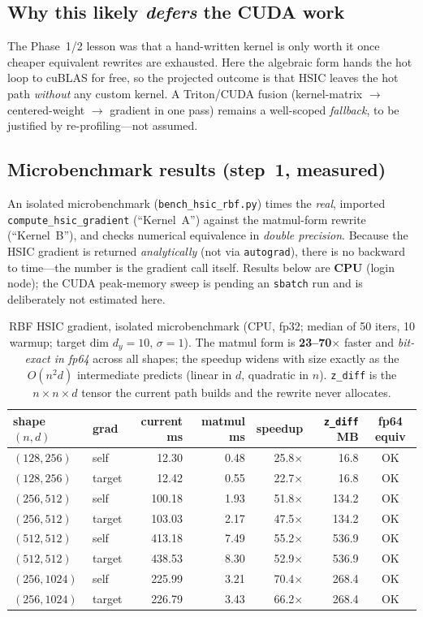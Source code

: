 \documentclass[11pt]{article}
\begin{document}
\subsection*{Why this likely \emph{defers} the CUDA work}
The Phase~1/2 lesson was that a hand-written kernel is only worth it once cheaper equivalent
rewrites are exhausted. Here the algebraic form hands the hot loop to cuBLAS for free, so the
projected outcome is that HSIC leaves the hot path \emph{without} any custom kernel. A Triton/CUDA
fusion (kernel-matrix $\to$ centered-weight $\to$ gradient in one pass) remains a well-scoped
\emph{fallback}, to be justified by re-profiling---not assumed.

\subsection*{Microbenchmark results (step~1, measured)}
An isolated microbenchmark (\texttt{bench\_hsic\_rbf.py}) times the \emph{real}, imported
\texttt{compute\_hsic\_gradient} (``Kernel~A'') against the matmul-form rewrite (``Kernel~B''),
and checks numerical equivalence in \emph{double precision}. Because the HSIC gradient is returned
\emph{analytically} (not via \texttt{autograd}), there is no backward to time---the number is the
gradient call itself. Results below are \textbf{CPU} (login node); the CUDA peak-memory sweep is
pending an \texttt{sbatch} run and is deliberately not estimated here.

\begin{table}[h]
\centering
\small
\begin{tabular}{@{}llrrrrc@{}}
\toprule
\textbf{shape $(n,d)$} & \textbf{grad} & \textbf{current ms} & \textbf{matmul ms} &
\textbf{speedup} & \textbf{\texttt{z\_diff} MB} & \textbf{fp64 equiv} \\
\midrule
$(128,256)$  & self   & 12.30  & 0.48 & 25.8$\times$ & 16.8  & OK \\
$(128,256)$  & target & 12.42  & 0.55 & 22.7$\times$ & 16.8  & OK \\
$(256,512)$  & self   & 100.18 & 1.93 & 51.8$\times$ & 134.2 & OK \\
$(256,512)$  & target & 103.03 & 2.17 & 47.5$\times$ & 134.2 & OK \\
$(512,512)$  & self   & 413.18 & 7.49 & 55.2$\times$ & 536.9 & OK \\
$(512,512)$  & target & 438.53 & 8.30 & 52.9$\times$ & 536.9 & OK \\
$(256,1024)$ & self   & 225.99 & 3.21 & 70.4$\times$ & 268.4 & OK \\
$(256,1024)$ & target & 226.79 & 3.43 & 66.2$\times$ & 268.4 & OK \\
\bottomrule
\end{tabular}
\caption{RBF HSIC gradient, isolated microbenchmark (CPU, fp32; median of 50 iters, 10 warmup;
target dim $d_y{=}10$, $\sigma{=}1$). The matmul form is \textbf{23--70$\times$} faster and
\emph{bit-exact in fp64} across all shapes; the speedup widens with size exactly as the
$O(n^2 d)$ intermediate predicts (linear in $d$, quadratic in $n$). \texttt{z\_diff} is the
$n\times n\times d$ tensor the current path builds and the rewrite never allocates.}
\end{table}
\end{document}
